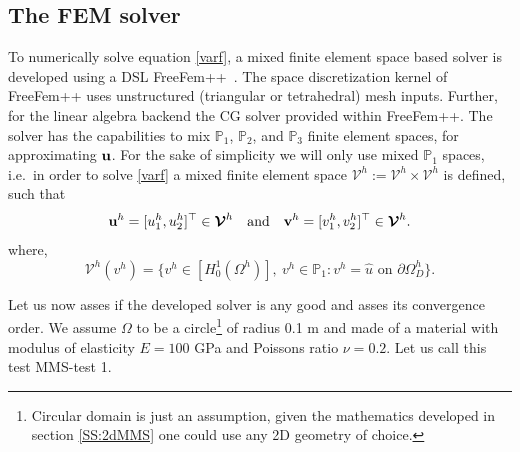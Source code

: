\subsection{The FEM solver}
To numerically solve equation \eqref{varf}, 
a mixed finite element space based solver is developed using a DSL FreeFem++~\cite{hecht2012new}. The  space discretization kernel of FreeFem++ uses unstructured (triangular or tetrahedral)  mesh inputs. Further, for the linear algebra backend the CG solver provided within FreeFem++. The solver has the capabilities to mix $\mathbb{P}_1$, $\mathbb{P}_2$, and $\mathbb{P}_3$ finite element spaces, for approximating ${\textbf{u}}$. For the sake of simplicity we will only use mixed $\mathbb{P}_1$ spaces, i.e.~in order to solve  \eqref{varf} a mixed finite element space $\boldsymbol{\mathcal{V}}^h:=\mathcal{V}^h\times\mathcal{V}^h$ is defined, such that  $${\textbf{u}}^h=[u_1^h,u_2^h]^\top\in\boldsymbol{\mathcal{V}}^h\quad\text{and}\quad{\textbf{v}}^h=[v_1^h,v_2^h]^\top\in\boldsymbol{\mathcal{V}}^h.$$ where, $$\mathcal{V}^h({v}^h)=\{{v}^h \in [H^1_0(\Omega^h)], ~{v}^h\in\mathbb{P}_1:{v}^h=\widehat{u} \text{~on~} \partial\Omega^h_D\}.$$

Let us now asses if the developed solver is any good and asses its convergence order. We assume $\Omega$ to be a circle\footnote{Circular domain is  just an assumption, given the mathematics developed in section \ref{SS:2dMMS} one could use any 2D geometry of choice.} of radius 0.1 m and made of a material with modulus of elasticity $E=100$ GPa and Poissons ratio $\nu=0.2$. Let us call this test MMS-test 1. 


